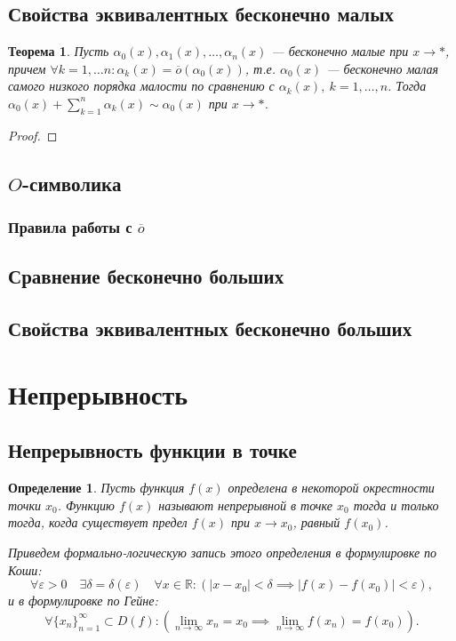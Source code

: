 \documentclass[a4paper,12pt]{article} %
\newtheorem{definition}{Определение}[section]
\newtheorem{theorem}{Теорема}[section]
\theoremstyle{remark}
\theoremstyle{definition}
\begin{document}
\subsection{Свойства эквивалентных бесконечно малых}
\begin{theorem}
	Пусть $\alpha_0(x), \alpha_1(x), \ldots, \alpha_n(x)$ --- бесконечно малые при $x\to *$, причем $\forall k = 1,
    \ldots n : \alpha_k(x) = \overline{o}(\alpha_0(x))$, т.е. $\alpha_0(x)$ --- 
    бесконечно малая самого низкого порядка малости по сравнению с $\alpha_k(x), \ k = 1, \ldots, n$.
    Тогда $\alpha_0(x) + \sum_{k=1}^{n} \alpha_k(x) \sim \alpha_0(x)$ при $x\to *$.
\end{theorem}
\begin{proof}
\end{proof}

\subsection{$O$-символика}

\subsubsection*{Правила работы с $\overline{o}$}

\subsection{Сравнение бесконечно больших}

\subsection{Свойства эквивалентных бесконечно больших}

\newpage
\section{Непрерывность}
\subsection{Непрерывность функции в точке}
\begin{definition}
	Пусть функция $f(x)$ определена в некоторой окрестности точки $x_0$. Функцию $f(x)$ называют непрерывной в точке $x_0$ тогда и только тогда, когда существует предел $f(x)$ при $x\to x_0$, равный $f(x_0)$.

	Приведем формально-логическую запись этого определения в формулировке по Коши:
	\[
	\forall \varepsilon > 0 \quad \exists \delta=\delta(\varepsilon) \quad \forall  x \in  \mathbb{R} : (|x-x_0| < \delta \implies |f(x) - f(x_0)| < \varepsilon),
	\] 
	и в формулировке по Гейне:
	\[
	\forall \{x_n\}_{n=1}^{\infty} \subset D(f) : (\lim_{n \to \infty} x_n = x_0 \implies \lim_{n \to \infty} f(x_n) = f(x_0))
	.\] 
\end{definition}
\end{document}
